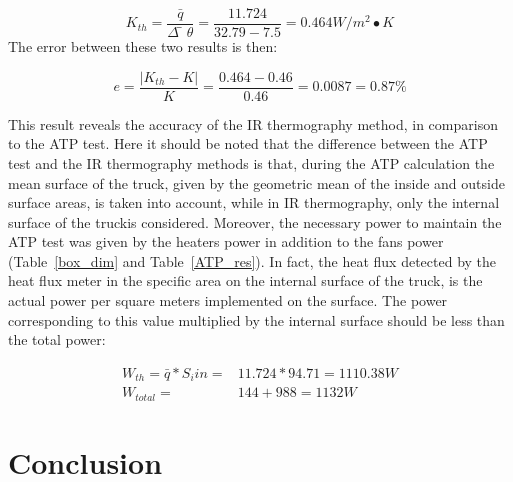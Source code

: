 \documentclass{tQRT2e}
\begin{document}
\begin{equation*}
K_{th}=\frac{\bar{q}}{\Delta ̅\theta} =\frac{11.724}{32.79-7.5}=0.464 W/m^2∙K 
\end{equation*}
The error between these two results is then:

\begin{equation*}
e=  \frac{|K_{th}-K|}{K}=\frac{0.464-0.46}{0.46}=0.0087=0.87\%
\end{equation*}

This result reveals the accuracy of the IR thermography method, in comparison to the ATP test. Here it should be noted that the difference between the ATP test and the IR thermography methods is that, during the ATP calculation the mean surface of the truck, given by the geometric mean of the inside and outside surface areas, is taken into account, while in IR thermography, only the internal surface of the truckis considered. Moreover, the necessary power to maintain the ATP test was given by the heaters power in addition to the fans power (Table~\ref{box_dim} and Table~\ref{ATP_res}). In fact, the heat flux detected by the heat flux meter in the specific area on the internal surface of the truck, is the actual power per square meters implemented on the surface. The power corresponding to this value multiplied by the internal surface should be less than the total power:

\begin{align*}
W_{th}= \bar{q}*S_i{in}=&11.724*94.71=1110.38 W \\
W_{total}= &144 + 988 = 1132 W
\end{align*}


\section{Conclusion}
\end{document}
